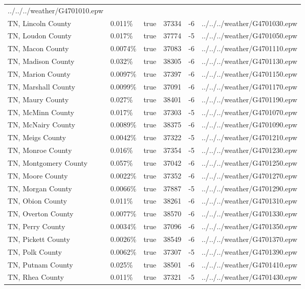 \begin{longtable}[]{@{}llllll@{}}
../../../weather/G4701010.epw \\
TN, Lincoln County & 0.011\% & true & 37334 & -6 &
../../../weather/G4701030.epw \\
TN, Loudon County & 0.017\% & true & 37774 & -5 &
../../../weather/G4701050.epw \\
TN, Macon County & 0.0074\% & true & 37083 & -6 &
../../../weather/G4701110.epw \\
TN, Madison County & 0.032\% & true & 38305 & -6 &
../../../weather/G4701130.epw \\
TN, Marion County & 0.0097\% & true & 37397 & -6 &
../../../weather/G4701150.epw \\
TN, Marshall County & 0.0099\% & true & 37091 & -6 &
../../../weather/G4701170.epw \\
TN, Maury County & 0.027\% & true & 38401 & -6 &
../../../weather/G4701190.epw \\
TN, McMinn County & 0.017\% & true & 37303 & -5 &
../../../weather/G4701070.epw \\
TN, McNairy County & 0.0089\% & true & 38375 & -6 &
../../../weather/G4701090.epw \\
TN, Meigs County & 0.0042\% & true & 37322 & -5 &
../../../weather/G4701210.epw \\
TN, Monroe County & 0.016\% & true & 37354 & -5 &
../../../weather/G4701230.epw \\
TN, Montgomery County & 0.057\% & true & 37042 & -6 &
../../../weather/G4701250.epw \\
TN, Moore County & 0.0022\% & true & 37352 & -6 &
../../../weather/G4701270.epw \\
TN, Morgan County & 0.0066\% & true & 37887 & -5 &
../../../weather/G4701290.epw \\
TN, Obion County & 0.011\% & true & 38261 & -6 &
../../../weather/G4701310.epw \\
TN, Overton County & 0.0077\% & true & 38570 & -6 &
../../../weather/G4701330.epw \\
TN, Perry County & 0.0034\% & true & 37096 & -6 &
../../../weather/G4701350.epw \\
TN, Pickett County & 0.0026\% & true & 38549 & -6 &
../../../weather/G4701370.epw \\
TN, Polk County & 0.0062\% & true & 37307 & -5 &
../../../weather/G4701390.epw \\
TN, Putnam County & 0.025\% & true & 38501 & -6 &
../../../weather/G4701410.epw \\
TN, Rhea County & 0.011\% & true & 37321 & -5 &
../../../weather/G4701430.epw \\

\end{longtable}
